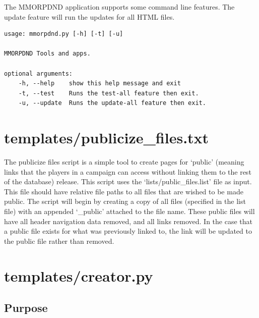 The MMORPDND application supports some command line features. The update feature will run the updates for all HTML files.

\begin{lstlisting}
usage: mmorpdnd.py [-h] [-t] [-u]

MMORPDND Tools and apps.

optional arguments:
	-h, --help    show this help message and exit
	-t, --test    Runs the test-all feature then exit.
	-u, --update  Runs the update-all feature then exit.
\end{lstlisting}







\section{templates/publicize\_files.txt}

The publicize files script is a simple tool to create pages for `public' (meaning links that the players in a campaign can access without linking them to the rest of the database) release. This script uses the `lists/public\_files.list' file as input. This file should have relative file paths to all files that are wished to be made public. The script will begin by creating a copy of all files (specified in the list file) with an appended `\_public' attached to the file name. These public files will have all header navigation data removed, and all links removed. In the case that a public file exists for what was previously linked to, the link will be updated to the public file rather than removed.



















\section{templates/creator.py}



\subsection{Purpose}

